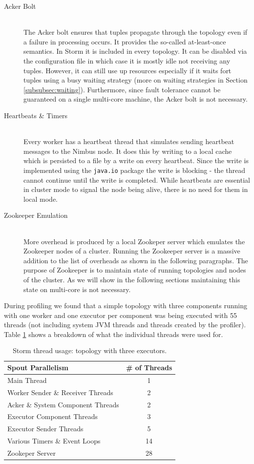 \begin{description}
	\item[Acker Bolt] \hfill \\
	The Acker bolt ensures that tuples propagate through the topology even if a failure in processing occurs. It provides the so-called at-least-once semantics. In Storm it is included in every topology. It can be disabled via the configuration file in which case it is mostly idle not receiving any tuples. However, it can still use up resources especially if it waits fort tuples using a busy waiting strategy (more on waiting strategies in Section \ref{subsubsec:waiting}). Furthermore, since fault tolerance cannot be guaranteed on a single multi-core machine, the Acker bolt is not necessary.
	\item[Heartbeats \& Timers] \hfill \\
	Every worker has a heartbeat thread that simulates sending heartbeat messages to the Nimbus node. It does this by writing to a local cache which is persisted to a file by a write on every heartbeat. Since the write is implemented using the \texttt{java.io} package the write is blocking - the thread cannot continue until the write is completed. While heartbeats are essential in cluster mode to signal the node being alive, there is no need for them in local mode.
	\item[Zookeeper Emulation] \hfill \\
	More overhead is produced by a local Zookeper server which emulates the Zookeeper nodes of a cluster. Running the Zookeeper server is a massive addition to the list of overheads as shown in the following paragraphs. The purpose of Zookeeper is to maintain state of running topologies and nodes of the cluster. As we will show in the following sections maintaining this state on multi-core is not necessary.
\end{description}

During profiling we found that a simple topology with three components running with one worker and one executor per component was being executed with 55 threads (not including system JVM threads and threads created by the profiler). Table \ref{table:breakdown} shows a breakdown of what the individual threads were used for.

\begin{table}[htb!]
\centering
\small
\begin{tabular}{@{}lc@{}}
    \textbf{Spout Parallelism} & \textbf{\# of Threads} \\ \toprule
    Main Thread & 1  \\
	Worker Sender \& Receiver Threads & 2  \\
    Acker \& System Component Threads & 2  \\
    Executor Component Threads & 3  \\
    Executor Sender Threads & 5  \\
    Various Timers \& Event Loops & 14  \\
    Zookeper Server & 28  \\
\end{tabular}
\caption[Storm thread usage]{Storm thread usage: topology with three executors.}
\label{table:breakdown}
\end{table}

